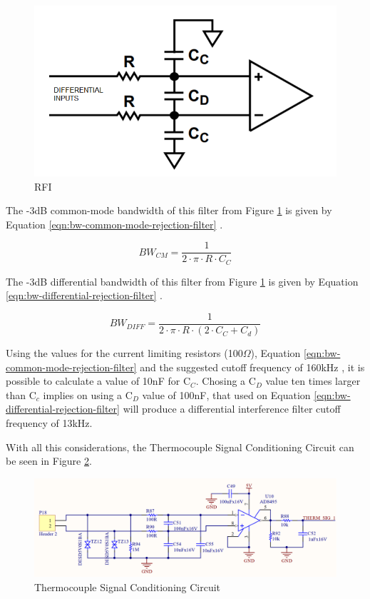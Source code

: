 		\begin{figure}[htbp]
			\centering
				\includegraphics[width=.8\textwidth]{figuras/fig-rfi-standard-filter}
			\caption{RFI}
			\label{fig:rfi-standard-filter}
		\end{figure}

	The -3dB common-mode bandwidth of this filter from Figure \ref{fig:rfi-standard-filter} is given by Equation \ref{eqn:bw-common-mode-rejection-filter} \cite{analogDevDesignersGuide}.

		\begin{equation}\label{eqn:bw-common-mode-rejection-filter}
			BW_{CM}=\frac{1}{2 \cdot \pi \cdot R \cdot C_{C}}
		\end{equation}
	
	The -3dB differential bandwidth of this filter from Figure \ref{fig:rfi-standard-filter} is given by Equation \ref{eqn:bw-differential-rejection-filter} \cite{analogDevDesignersGuide}.
	
		\begin{equation}\label{eqn:bw-differential-rejection-filter}
			BW_{DIFF}=\frac{1}{2 \cdot \pi \cdot R \cdot \left( 2 \cdot C_{C} + C_{d} \right)}
		\end{equation}
		
	Using the values for the current limiting resistors (100$\Omega$), Equation \ref{eqn:bw-common-mode-rejection-filter} and the suggested cutoff frequency of 160kHz \cite{two-ways-thermocouple}, it is possible to calculate a value of 10nF for C$_{C}$. Chosing a C$_{D}$ value ten times larger than C$_{c}$ implies on using a C$_{D}$ value of 100nF, that used on Equation \ref{eqn:bw-differential-rejection-filter} will produce a differential interference filter cutoff frequency of 13kHz.
	\par
	With all this considerations, the Thermocouple Signal Conditioning Circuit can be seen in Figure \ref{fig:temperature-acq-cic}.

	\begin{figure}[htbp]
			\centering
				\includegraphics[width=1\textwidth]{figuras/fig-temperature-acq-cic}
			\caption{Thermocouple Signal Conditioning Circuit}
			\label{fig:temperature-acq-cic}
	\end{figure}

